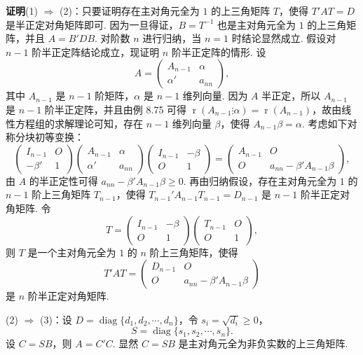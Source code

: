 \documentclass[UTF8,12pt,a4paper,fontset=fandol]{ctexart}
\begin{document}
\noindent\textbf{证明}\quad (1) $\Rightarrow$ (2)：只要证明存在主对角元全为 $1$ 的上三角矩阵 $T$，使得 $T'AT=D$ 是半正定对角矩阵即可. 因为一旦得证，$B=T^{-1}$ 也是主对角元全为 $1$ 的上三角矩阵，并且 $A=B'DB$. 对阶数 $n$ 进行归纳，当 $n=1$ 时结论显然成立. 假设对 $n-1$ 阶半正定阵结论成立，现证明 $n$ 阶半正定阵的情形. 设
\[
A=\left(\begin{array}{cc}
A_{n-1} & \alpha\\
\alpha' & a_{nn}
\end{array}\right),
\]
其中 $A_{n-1}$ 是 $n-1$ 阶矩阵，$\alpha$ 是 $n-1$ 维列向量. 因为 $A$ 半正定，所以 $A_{n-1}$ 是 $n-1$ 阶半正定阵，并且由例 8.75 可得 $\operatorname{r}(A_{n-1}\vdots\alpha)=\operatorname{r}(A_{n-1})$，故由线性方程组的求解理论可知，存在 $n-1$ 维列向量 $\beta$，使得 $A_{n-1}\beta=\alpha$. 考虑如下对称分块初等变换：
\[
\left(\begin{array}{cc}
I_{n-1} & O\\
-\beta' & 1
\end{array}\right)
\left(\begin{array}{cc}
A_{n-1} & \alpha\\
\alpha' & a_{nn}
\end{array}\right)
\left(\begin{array}{cc}
I_{n-1} & -\beta\\
O & 1
\end{array}\right)
=
\left(\begin{array}{cc}
A_{n-1} & O\\
O & a_{nn}-\beta'A_{n-1}\beta
\end{array}\right),
\]
由 $A$ 的半正定性可得 $a_{nn}-\beta'A_{n-1}\beta\ge 0$. 再由归纳假设，存在主对角元全为 $1$ 的 $n-1$ 阶上三角矩阵 $T_{n-1}$，使得 $T_{n-1}'A_{n-1}T_{n-1}=D_{n-1}$ 是 $n-1$ 阶半正定对角矩阵. 令
\[
T=
\left(\begin{array}{cc}
I_{n-1} & -\beta\\
O & 1
\end{array}\right)
\left(\begin{array}{cc}
T_{n-1} & O\\
O & 1
\end{array}\right),
\]
则 $T$ 是一个主对角元全为 $1$ 的 $n$ 阶上三角矩阵，使得
\[
T'AT=
\left(\begin{array}{cc}
D_{n-1} & O\\
O & a_{nn}-\beta'A_{n-1}\beta
\end{array}\right)
\]
是 $n$ 阶半正定对角矩阵.

(2) $\Rightarrow$ (3)：设 $D=\operatorname{diag}\{d_1,d_2,\cdots,d_n\}$，令 $s_i=\sqrt{d_i}\ge 0$，
\[
S=\operatorname{diag}\{s_1,s_2,\cdots,s_n\}.
\]
设 $C=SB$，则 $A=C'C$. 显然 $C=SB$ 是主对角元全为非负实数的上三角矩阵.
\end{document}

